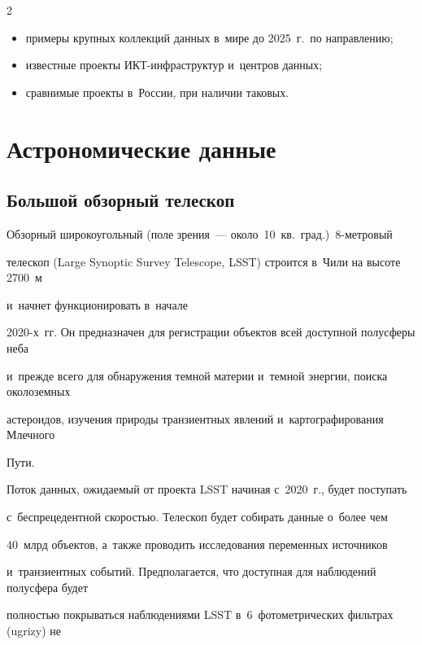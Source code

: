 \begin{multicols}{2}
\begin{itemize}
\item примеры крупных коллекций данных в~мире до 2025~г.\ по направлению;


\item известные проекты ИКТ-инфраструктур и~центров данных;


\item сравнимые проекты в~России, при наличии таковых.


\end{itemize}





\section{Астрономические данные}





\subsection{Большой обзорный телескоп}





  Обзорный широкоугольный (поле зрения~--- около~10~кв.\ град.)\ 8-мет\-ро\-вый 


телескоп  (Large Synoptic Survey Telescope, LSST) строится в~Чили на высоте 2700~м 


и~начнет функционировать в~начале  


2020-х~гг. Он предназначен для регистрации объектов всей доступной полусферы неба 


и~прежде всего для обнаружения темной материи и~темной энергии, поиска околоземных 


астероидов, изучения природы транзиентных явлений и~картографирования Млечного 


Пути.


  


  Поток данных, ожидаемый от проекта LSST начиная с~2020~г., будет поступать 


с~беспрецедентной скоростью. Телескоп будет собирать данные о~более чем 


40~млрд объектов, а~так\-же проводить исследования переменных источников 


и~транзиентных событий. Предполагается, что доступная для наблю\-де\-ний полусфера будет 


полностью покрываться наблюдениями LSST в~6~фотометрических фильтрах (ugrizy) не 



\end{multicols}
